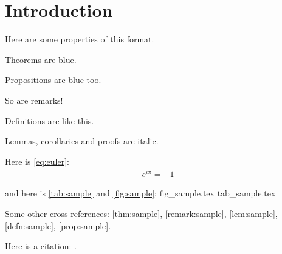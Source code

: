 \section{Introduction}\label{sec:intro}
	Here are some properties of this format.

	\begin{thm}\label{thm:sample}
		Theorems are blue.
	\end{thm}

	\begin{prop}\label{prop:sample}
		Propositions are blue too.
	\end{prop}

	\begin{remark}\label{remark:sample}
		So are remarks!
	\end{remark}

	\begin{defn}\label{defn:sample}
		Definitions are like this.
	\end{defn}

	\begin{lem}\label{lem:sample}
		Lemmas, corollaries and proofs are italic.
	\end{lem}

	Here is \cref{eq:euler}:
	\begin{align}\label{eq:euler}
		e^{i\pi} = -1 
	\end{align}

	and here is \cref{tab:sample} and \cref{fig:sample}:
	{fig_sample.tex}
	{tab_sample.tex}

	Some other cross-references:
	\cref{thm:sample},
	\cref{remark:sample},
	\cref{lem:sample},
	\cref{defn:sample},
	\cref{prop:sample}.

	Here is a citation: \cite{afrouzi2016dynamic}.